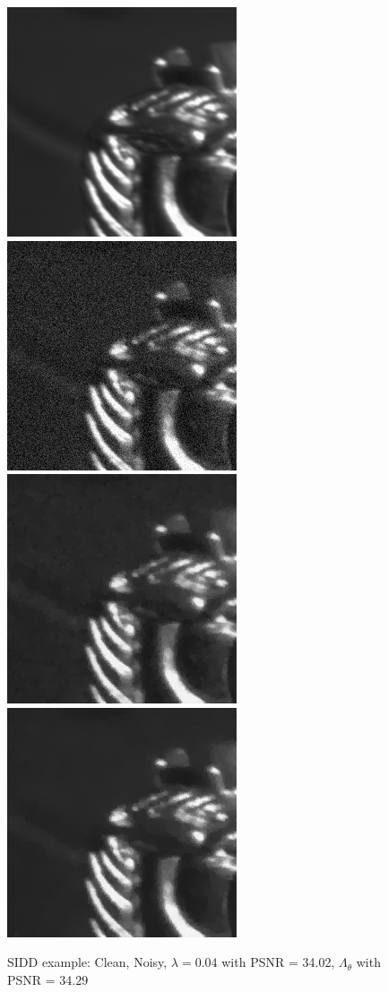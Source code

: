 \documentclass[12pt]{article}
\begin{document}
\begin{figure}[h]
    \centering
    \includegraphics[width=0.34\linewidth]{100-clean.png}
    \includegraphics[width=0.34\linewidth]{100-noisy-mse.png}
    \includegraphics[width=0.34\linewidth]{100-psnr_34.02-lambda_0.04.png}
    \includegraphics[width=0.34\linewidth]{100-denoised-mse_24.42-psnr_34.29-ssim_0.96.png}
    \caption{SIDD example: Clean, Noisy, $\lambda = 0.04$ with PSNR = 34.02, $\Lambda_\theta$ with PSNR = 34.29}
    \label{fig:enter-label}
\end{figure}

\end{document}
